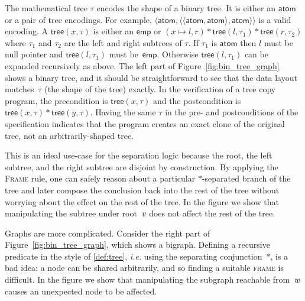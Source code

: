 \documentclass[acmsmall,screen]{acmart}
\newcommand{\scon}{\mathbin{\star}}
\renewcommand{\scon}{\mathbin{\ast}} \renewcommand{\bigstar}{\raisebox{-0.24em}{{\scaleobj{2.5}{\scon}}}}
\newcommand{\infrulestyle}[1]{\textsc{#1}}
\begin{document}
The mathematical tree $\tau$ encodes the
shape of a binary tree. It is either an $\mathsf{atom}$ or a pair of
tree encodings. For example,
$\langle \mathsf{atom}, \langle \langle \mathsf{atom}, \mathsf{atom} \rangle, \mathsf{atom} \rangle \rangle$
is a valid encoding. A $\mathsf{tree}(x, \tau)$ is either an
$\mathsf{emp}$ or $(x \mapsto
l,r) \scon \mathsf{tree}(l, \tau_1) \scon \mathsf{tree}(r, \tau_2)$
where $\tau_1$ and $\tau_2$ are the left and right subtrees of $\tau$.
If $\tau_1$ is $\mathsf{atom}$ then $l$ must be null pointer and
$\mathsf{tree}(l, \tau_1)$ must be~$\mathsf{emp}$.
Otherwise $\mathsf{tree}(l, \tau_1)$ can be expanded recursively as above.
The left part of Figure~\ref{fig:bin_tree_graph} shows a binary tree, 
and it should be straightforward to see that the data layout matches~$\tau$ 
(the shape of the tree) exactly. In the verification of a tree
copy program, the precondition is $\mathsf{tree}(x, \tau)$ and the
postcondition is
$\mathsf{tree}(x, \tau) \scon \mathsf{tree}(y, \tau)$. 
Having the same $\tau$ in the pre- and postconditions
of the specification indicates that the program creates an exact clone
of the original tree, not an arbitrarily-shaped tree.

This is an ideal use-case for the separation logic
because the root, the left subtree, 
and the right subtree are disjoint by construction. By applying
the \textsc{Frame} rule, one can safely reason about a particular 
$\scon$-separated branch of the tree and later compose the 
conclusion back into the rest of the tree
without worrying about the effect on the rest of the tree. 
In the figure we show that manipulating the subtree under 
root~$\mathit{v}$ does not affect the rest of the tree.

Graphs are more complicated.
Consider the right part of Figure~\ref{fig:bin_tree_graph},
which shows a bigraph. 
Defining a recursive predicate in the style of \eqref{def:tree},
\emph{i.e.} using the separating conjunction~$\scon$, is a bad idea: 
a node can be shared arbitrarily, and so finding a suitable 
\infrulestyle{frame} is difficult. 
In the figure we show that manipulating the subgraph reachable 
from~$\mathit{w}$ causes an unexpected node to be affected.
\end{document}

